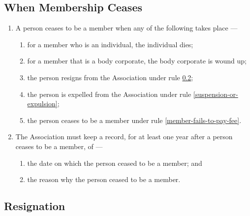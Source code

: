\documentclass[../constitution.tex]{subfiles}
\begin{document}
\subsection{When Membership Ceases} \label{when-membership-ceases}

\begin{enumerate}

  \item A person ceases to be a member when any of the following takes place ---

        \begin{enumerate}

          \item for a member who is an individual, the individual dies;
          \item for a member that is a body corporate, the body corporate is wound up;
          \item the person resigns from the Association under rule \ref{resignation};
          \item the person is expelled from the Association under rule \ref{suspension-or-expulsion};
          \item the person ceases to be a member under rule \ref{member-fails-to-pay-fee}.
        \end{enumerate}
  \item The Association must keep a record, for at least one year after a person ceases to be a member, of ---

        \begin{enumerate}

          \item the date on which the person ceased to be a member; and
          \item the reason why the person ceased to be a member.
        \end{enumerate}
\end{enumerate}


\subsection{Resignation} \label{resignation}
\end{document}
